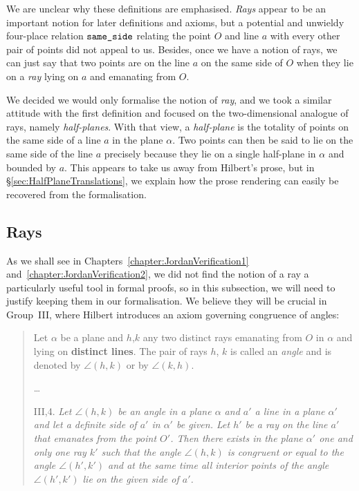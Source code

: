 We are unclear why these definitions are emphasised. \emph{Rays} appear to be an important notion for later definitions and axioms, but a potential and unwieldy four-place relation $\texttt{same\_side}$
relating the point $O$ and line $a$ with every other pair of points did not appeal to us. Besides, once we have a notion of rays, we can just say that two points are on the line $a$ on the same side of $O$ when they lie on a \emph{ray} lying on $a$ and emanating from $O$.

We decided we would only formalise the notion of \emph{ray}, and we took a similar attitude with the first definition and focused on the two-dimensional analogue of rays, namely \emph{half-planes}. With that view, a \emph{half-plane} is the totality of points on the same side of a line $a$ in the plane $\alpha$. Two points can then be said to lie on the same side of the line $a$ precisely because they lie on a single half-plane in $\alpha$ and bounded by $a$. This appears to take us away from Hilbert's prose, but in \S\ref{sec:HalfPlaneTranslations}, we explain how the prose rendering can easily be recovered from the formalisation.

\subsection{Rays}
As we shall see in Chapters~\ref{chapter:JordanVerification1} and~\ref{chapter:JordanVerification2}, we did not find the notion of a ray a particularly useful tool in formal proofs, so in this subsection, we will need to justify keeping them in our formalisation. We believe they will be crucial in Group~III, where Hilbert introduces an axiom governing congruence of angles:

\begin{quotation}
  Let $\alpha$ be a plane and $h$,$k$ any two distinct rays emanating from $O$ in $\alpha$ and lying on {\bfseries distinct lines}. The pair of rays $h$, $k$ is called an \emph{angle} and is denoted by $\angle(h,k)$ or by $\angle(k,h)$.

\ldots

III,4. \emph{Let $\angle (h,k)$ be an angle in a plane $\alpha$ and $a'$ a line in a plane $\alpha'$ and let a definite side of $a'$ in $\alpha'$ be given. Let $h'$ be a ray on the line $a'$ that emanates from the point $O'$. Then there exists in the plane $\alpha'$ one and only one ray $k'$ such that the angle $\angle (h,k)$ is congruent or equal to the angle $\angle (h',k')$ and at the same time all interior points of the angle $\angle (h',k')$ lie on the given side of $a'$.}
\end{quotation}

